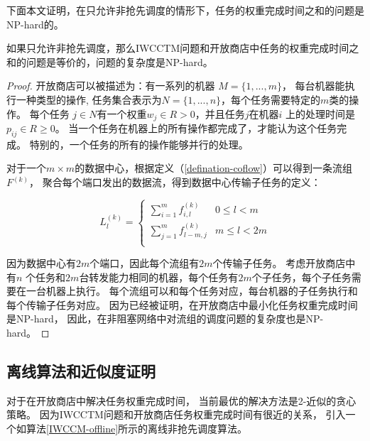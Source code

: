 下面本文证明，在只允许非抢先调度的情形下，任务的权重完成时间之和的问题是NP-hard的。

 \begin{lemma}\label{IWCCTM-proof2}
 如果只允许非抢先调度，那么IWCCTM问题和开放商店中任务的权重完成时间之和的问题是等价的，问题的复杂度是NP-hard。
\end{lemma}

\begin{proof}
开放商店可以被描述为：有一系列的机器 $M = \{1,...,m\}$，
每台机器能执行一种类型的操作,
任务集合表示为$N = \{1,...,n\}$，每个任务需要特定的$m$类的操作。
每个任务 $j \in N$有一个权重$w_j \in R > 0$，并且任务$j$在机器$i$ 上的处理时间是$p_{ij} \in R\ge0$。
当一个任务在机器上的所有操作都完成了，才能认为这个任务完成。
特别的，一个任务的所有的操作能够并行的处理。

对于一个$m \times m$的数据中心，根据定义（\ref{defination-coflow}）可以得到一条流组 $F^{(k)}$，
聚合每个端口发出的数据流，得到数据中心传输子任务的定义：

\begin{equation}
\label{coflow-subtask}
 L_l^{(k)}=\left\{
\begin{array}{rcl}
\sum_{i=1}^{m}f_{i,l}^{(k)}& {0      \le l   <m} \\
\sum_{j=1}^{m}f_{l-m,j}^{(k)} & {m      \le l   <2m} \\
\end{array} \right. 
\end{equation}

因为数据中心有$2m$个端口，因此每个流组有$2m$个传输子任务。
考虑开放商店中有$n$ 个任务和$2m$台转发能力相同的机器，每个任务有$2m$个子任务，每个子任务需要在一台机器上执行。
每个流组可以和每个任务对应，每台机器的子任务执行和每个传输子任务对应。
因为已经被证明，在开放商店中最小化任务权重完成时间是NP-hard\cite{mastrolilli2010minimizing}\cite{chen2000supply}\cite{roemer2006note}\cite{Qiu2016Experimental}，
因此，在非阻塞网络中对流组的调度问题的复杂度也是NP-hard。
\end{proof}


\subsection{离线算法和近似度证明}
对于在开放商店中解决任务权重完成时间，
当前最优的解决方法是2-近似的贪心策略\cite{mastrolilli2010minimizing,kumar2011lp}。
因为IWCCTM问题和开放商店任务权重完成时间有很近的关系，
引入一个如算法\ref{IWCCM-offline}所示的离线非抢先调度算法。




